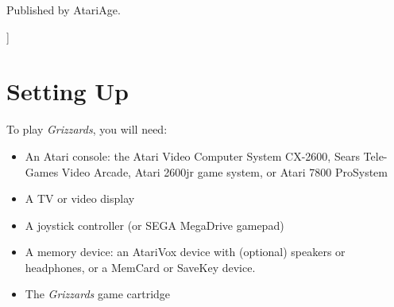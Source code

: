 \documentclass[10pt,twocolumn,openany,article]{memoir}
\begin{document}
\else

Published by AtariAge.

\fi

]

\let\cleardoublepage\clearpage

\mainmatter

\tableofcontents

\chapter{Setting Up}\label{Setting Up}

To play \textit{Grizzards}, you will need:

\begin{itemize}
\item An Atari  console: the Atari Video Computer  System CX-2600, Sears
  Tele-Games  Video Arcade,  Atari  2600jr game  system,  or Atari  7800
  ProSystem
\item A TV or video display
\item        A        joystick         controller        (or        SEGA
  \ifdefined{}\fi{}MegaDrive gamepad)
  \ifdefined\NOSAVE\else
\item A  memory device: an  AtariVox device with (optional)  speakers or
  headphones, or a MemCard or SaveKey device.
  \fi
\item The \textit{Grizzards} game cartridge
\end{itemize}
\end{document}
